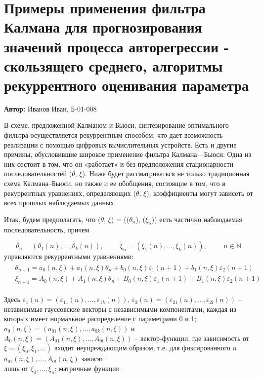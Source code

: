

\section{Примеры применения фильтра Калмана для прогнозирования значений процесса авторегрессии - скользящего среднего, алгоритмы рекуррентного оценивания параметра}

 \textbf{Автор:} Иванов Иван, Б-01-008

В схеме, предложенной Калманом и Бьюси, синтезирование оптимального фильтра осуществляется рекуррентным способом, что дает возможность реализации с помощью цифровых вычислительных устройств. Есть и другие причины, обусловившие широкое применение фильтра Калмана––Бьюси.
Одна из них состоит в том, что он «работает» и без предположения стационарности последовательностей ($\theta$, $\xi$).
Ниже будет рассматриваться не только традиционная схема Калмана–Бьюси, но также и ее обобщения, состоящие в том, что в рекуррентных уравнениях, определяющих ($\theta$, $\xi$), коэффициенты могут зависеть от всех прошлых наблюдаемых данных.

Итак, будем предполагать, что ($\theta$, $\xi$) = (($\theta_n$), ($\xi_n$)) есть частично наблюдаемая последовательность, причем

$$\theta_n = (\theta_1(n), ..., \theta_k(n)), \hspace{1cm} \xi_n = (\xi_1(n), ..., \xi_k(n)), \hspace{1cm} n \in \mathbb{N}$$
управляются рекуррентными уравнениями:
\begin{align}
\label{eq:first}
\begin{split}
& \theta_{n + 1} = a_0(n, \xi) + a_1(n, \xi) \theta_n + b_0(n, \xi) \varepsilon_1(n + 1) + b_1(n, \xi) \varepsilon_2(n + 1) \\
& \xi_{n + 1} = A_0(n, \xi) + A_1(n, \xi) \theta_n + B_0(n, \xi) \varepsilon_1(n + 1) + B_1(n, \xi) \varepsilon_2(n + 1)
\end{split}
\end{align}

Здесь $\varepsilon_1(n) = (\varepsilon_{11}(n), ..., \varepsilon_{1k}(n))$, $\varepsilon_2(n) = (\varepsilon_{21}(n), ..., \varepsilon_{2l}(n))$ – независимые гауссовские векторы с независимыми компонентами, каждая из которых имеет нормальное распределение с параметрами 0 и 1; $a_0 (n, \xi) = (a_{01} (n, \xi), ..., a_{0k} (n, \xi))$  и $A_0 (n, \xi) = (A_{01} (n, \xi), ..., A_{0l} (n, \xi))$ – вектор-функции, где зависимость от $\xi = (\xi_0, \xi_1, ...)$ входит неупреждающим образом, т.е. для фиксированного $n$ $a_{01} (n, \xi), ..., A_{0l} (n, \xi)$ зависят \\ лишь от $\xi_0, ..., \xi_n$; матричные функции

